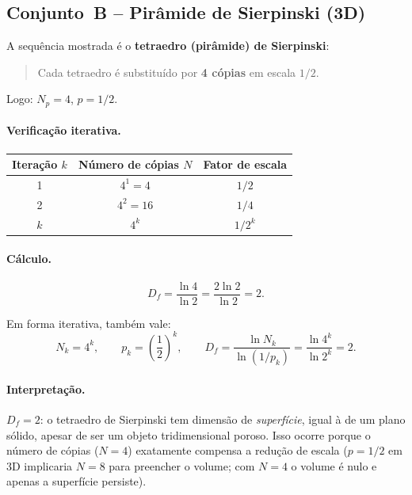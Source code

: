 \documentclass[12pt,a4paper]{article}
\theoremstyle{definition}
\newcommand{\resultado}[1]{%
  \begin{center}
    \fbox{\parbox{0.85\linewidth}{\centering $\displaystyle #1$}}
  \end{center}
}
\begin{document}
\subsection{Conjunto~B -- Pir\^amide de Sierpinski (3D)}

A sequ\^encia mostrada \'e o \textbf{tetraedro (pir\^amide) de Sierpinski}:
\begin{quote}
  Cada tetraedro \'e substitu\'ido por \textbf{4 c\'opias} em escala $1/2$.
\end{quote}
Logo: $N_p = 4$, $p = 1/2$.

\paragraph{Verifica\c{c}\~ao iterativa.}
\begin{center}
\begin{tabular}{ccc}
\toprule
Itera\c{c}\~ao $k$ & N\'umero de c\'opias $N$ & Fator de escala\\
\midrule
1 & $4^1 = 4$    & $1/2$ \\
2 & $4^2 = 16$   & $1/4$ \\
$k$ & $4^k$      & $1/2^k$ \\
\bottomrule
\end{tabular}
\end{center}

\paragraph{C\'alculo.}
\begin{equation}
  D_f = \frac{\ln 4}{\ln 2}
      = \frac{2\ln 2}{\ln 2} = 2.
\end{equation}
\resultado{D_f = 2}

Em forma iterativa, tamb\'em vale:
\begin{equation}
  N_k = 4^k,
  \qquad
  p_k = \left(\frac{1}{2}\right)^k,
  \qquad
  D_f = \frac{\ln N_k}{\ln(1/p_k)} = \frac{\ln 4^k}{\ln 2^k} = 2.
\end{equation}

\paragraph{Interpreta\c{c}\~ao.}
$D_f = 2$: o tetraedro de Sierpinski tem dimens\~ao de \emph{superf\'icie},
igual \`a de um plano s\'olido, apesar de ser um objeto tridimensional poroso.
Isso ocorre porque o n\'umero de c\'opias ($N=4$) exatamente compensa a redu\c{c}\~ao
de escala ($p = 1/2$ em 3D implicaria $N = 8$ para preencher o volume;
com $N=4$ o volume \'e nulo e apenas a superf\'icie persiste).
\end{document}
